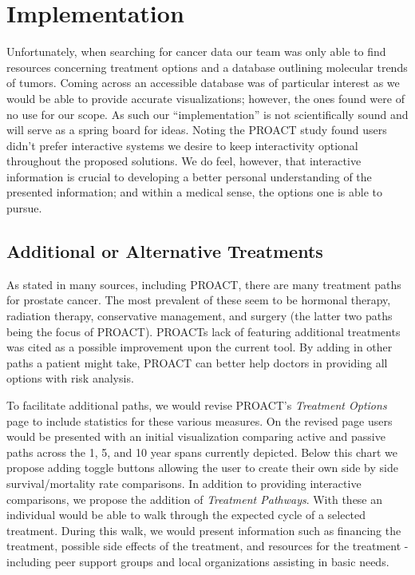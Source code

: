 \documentclass[journal]{vgtc}                %
\begin{document}
\section{Implementation}
        Unfortunately, when searching for cancer data our team was only able to find resources concerning treatment options and a database outlining molecular trends of tumors.
        Coming across an accessible database was of particular interest as we would be able to provide accurate visualizations; however, the ones found were of no use for our scope.
        As such our ``implementation'' is not scientifically sound and will serve as a spring board for ideas.
        Noting the PROACT study found users didn't prefer interactive systems we desire to keep interactivity optional throughout the proposed solutions.
        We do feel, however, that interactive information is crucial to developing a better personal understanding of the presented information; and within a medical sense, the options one is able to pursue.

        \subsection{Additional or Alternative Treatments}
                As stated in many sources, including PROACT, there are many treatment paths for prostate cancer.
                The most prevalent of these seem to be hormonal therapy, radiation therapy, conservative management, and surgery (the latter two paths being the focus of PROACT).
                PROACTs lack of featuring additional treatments was cited as a possible improvement upon the current tool.
                By adding in other paths a patient might take, PROACT can better help doctors in providing all options with risk analysis.

                To facilitate additional paths, we would revise PROACT's \textit{Treatment Options} page to include statistics for these various measures.
                On the revised page users would be presented with an initial visualization comparing active and passive paths across the 1, 5, and 10 year spans currently depicted.
                Below this chart we propose adding toggle buttons allowing the user to create their own side by side survival/mortality rate comparisons.
                In addition to providing interactive comparisons, we propose the addition of \textit{Treatment Pathways}.
                With these an individual would be able to walk through the expected cycle of a selected treatment.
                During this walk, we would present information such as financing the treatment, possible side effects of the treatment, and resources for the treatment - including peer support groups and local organizations assisting in basic needs.
\end{document}
